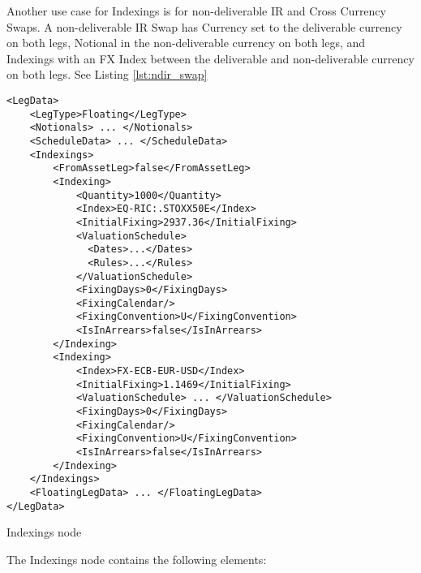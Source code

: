 Another use case for Indexings is for non-deliverable IR and Cross Currency Swaps. A non-deliverable IR Swap has Currency set to the deliverable currency on both legs, Notional in the non-deliverable currency on both legs, and Indexings with an FX Index between the deliverable and non-deliverable currency on both legs. See Listing \ref{lst:ndir_swap}

\begin{listing}[H]
\begin{verbatim}
<LegData>
    <LegType>Floating</LegType>
    <Notionals> ... </Notionals>
    <ScheduleData> ... </ScheduleData>
    <Indexings>
        <FromAssetLeg>false</FromAssetLeg>
        <Indexing>
            <Quantity>1000</Quantity>
            <Index>EQ-RIC:.STOXX50E</Index>
            <InitialFixing>2937.36</InitialFixing>
            <ValuationSchedule>
              <Dates>...</Dates>
              <Rules>...</Rules>
            </ValuationSchedule>
            <FixingDays>0</FixingDays>
            <FixingCalendar/>
            <FixingConvention>U</FixingConvention>
            <IsInArrears>false</IsInArrears>
        </Indexing>
        <Indexing>
            <Index>FX-ECB-EUR-USD</Index>
            <InitialFixing>1.1469</InitialFixing>
            <ValuationSchedule> ... </ValuationSchedule>
            <FixingDays>0</FixingDays>
            <FixingCalendar/>
            <FixingConvention>U</FixingConvention>
            <IsInArrears>false</IsInArrears>
        </Indexing>
    </Indexings>
    <FloatingLegData> ... </FloatingLegData>
</LegData>
\end{verbatim}
\caption{Indexings node}
\label{lst:indexings}
\end{listing}

The Indexings node contains the following elements:

